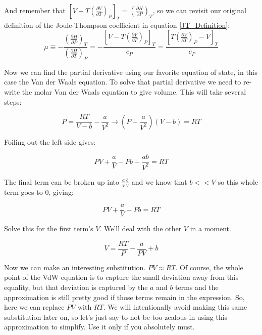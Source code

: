\documentclass[12pt,letterpaper]{article}
\begin{document}
	And remember that $\left[V-T \left(\frac{\partial V}{\partial T}\right)_P\right]_T=\left(\frac{\partial H}{\partial P}\right)_T$, so we can revisit our original definition of the Joule-Thompson coefficient in equation \ref{JT_Definition}:
	\begin{equation}\label{JT_Rearranged}
		\mu\equiv-\frac{\left(\frac{\partial H}{\partial P}\right)_T}{\left(\frac{\partial H}{\partial T}\right)_P} = -\frac{\left[V-T \left(\frac{\partial V}{\partial T}\right)_P\right]_T}{c_P} = \frac{\left[T \left(\frac{\partial V}{\partial T}\right)_P-V\right]_T}{c_P}
	\end{equation}
	
	Now we can find the partial derivative using our favorite equation of state, in this case the Van der Waals equation. To solve that partial derivative we need to re-write the molar Van der Waals equation to give volume. This will take several steps:
	
	\begin{equation}
		P = \dfrac{RT}{V-b}-\dfrac{a}{V^2} \longrightarrow \left(P + \dfrac{a}{V^2}\right)\left(V-b\right) = RT 	
	\end{equation}

	Foiling out the left side gives:
	
	\begin{equation}
		PV + \dfrac{a}{V} - Pb - \dfrac{ab}{V^2} = RT
	\end{equation}
	
	The final term can be broken up into $\frac{a}{V}\frac{b}{V}$ and we know that $b<<V$ so this whole term goes to $0$, giving:
	
	\begin{equation}
		PV + \dfrac{a}{V} - Pb = RT
	\end{equation}
	
	Solve this for the first term's $V$. We'll deal with the other $V$ in a moment.
	
	\begin{equation}
		V = \dfrac{RT}{P} - \dfrac{a}{PV} + b
	\end{equation}

	Now we can make an interesting substitution. $PV\approx RT$. Of course, the whole point of the VdW equation is to capture the small deviation away from this equality, but that deviation is captured by the $a$ and $b$ terms and the approximation is still pretty good if those terms remain in the expression. So, here we can replace $PV$ with $RT$. We will intentionally avoid making this same substitution later on, so let's just say to not be too zealous in using this approximation to simplify. Use it only if you absolutely must.
	
\end{document}
